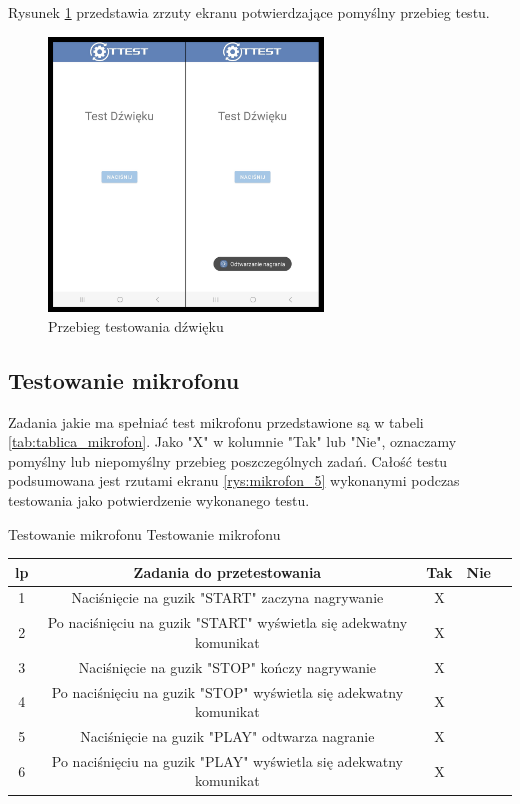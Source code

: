Rysunek \ref{rys:dzwiek} przedstawia zrzuty ekranu potwierdzające pomyślny przebieg testu.

\begin{figure}[!hbt]
	\begin{center}
		\includegraphics[angle=360, width=0.65\textwidth]{rys/punkt5/dzwiek.png}
		\caption{Przebieg testowania dźwięku}
		\label{rys:dzwiek}
	\end{center}
\end{figure} 

\newpage


\subsection{Testowanie mikrofonu}

\hspace{0.60cm}Zadania jakie ma spełniać test mikrofonu przedstawione są w tabeli \ref{tab:tablica_mikrofon}. Jako "X" w kolumnie "Tak" lub "Nie", oznaczamy pomyślny lub niepomyślny przebieg poszczególnych zadań. Całość testu podsumowana jest rzutami ekranu \ref{rys:mikrofon_5} wykonanymi podczas testowania jako potwierdzenie wykonanego testu.

\begin{tabela}
	{Testowanie mikrofonu}	%
	{Testowanie mikrofonu}	%
	{
		\begin{tabular}{|c|c|c|c|c|} \hline
			\textbf{lp} & \textbf{Zadania do przetestowania} & \textbf{Tak} & \textbf{Nie} \\ \hline
			1 & Naciśnięcie na guzik "START" zaczyna nagrywanie & X & ~ \\ \hline
			2 & Po naciśnięciu na guzik "START" wyświetla się adekwatny komunikat & X & ~ \\ \hline
			3 & Naciśnięcie na guzik "STOP" kończy nagrywanie & X & ~ \\ \hline
			4 & Po naciśnięciu na guzik "STOP" wyświetla się adekwatny komunikat & X & ~ \\ \hline
			5 & Naciśnięcie na guzik "PLAY" odtwarza nagranie & X & ~ \\ \hline
			6 &  Po naciśnięciu na guzik "PLAY" wyświetla się adekwatny komunikat & X & ~ \\ \hline
	\end{tabular}	}
	\label{tab:tablica_mikrofon}
\end{tabela}

